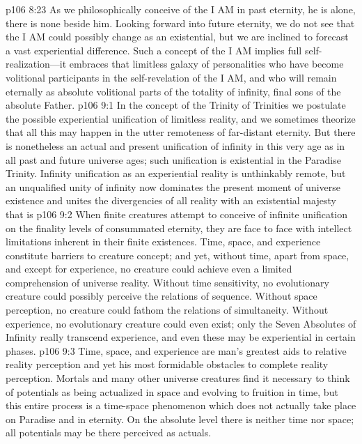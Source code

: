 \vs p106 8:23 As we philosophically conceive of the I AM in past eternity, he is alone, there is none beside him. Looking forward into future eternity, we do not see that the I AM could possibly change as an existential, but we are inclined to forecast a vast experiential difference. Such a concept of the I AM implies full self\hyp{}realization---it embraces that limitless galaxy of personalities who have become volitional participants in the self\hyp{}revelation of the I AM, and who will remain eternally as absolute volitional parts of the totality of infinity, final sons of the absolute Father.
\vs p106 9:1 In the concept of the Trinity of Trinities we postulate the possible experiential unification of limitless reality, and we sometimes theorize that all this may happen in the utter remoteness of far\hyp{}distant eternity. But there is nonetheless an actual and present unification of infinity in this very age as in all past and future universe ages; such unification is existential in the Paradise Trinity. Infinity unification as an experiential reality is unthinkably remote, but an unqualified unity of infinity now dominates the present moment of universe existence and unites the divergencies of all reality with an existential majesty that is 
\vs p106 9:2 When finite creatures attempt to conceive of infinite unification on the finality levels of consummated eternity, they are face to face with intellect limitations inherent in their finite existences. Time, space, and experience constitute barriers to creature concept; and yet, without time, apart from space, and except for experience, no creature could achieve even a limited comprehension of universe reality. Without time sensitivity, no evolutionary creature could possibly perceive the relations of sequence. Without space perception, no creature could fathom the relations of simultaneity. Without experience, no evolutionary creature could even exist; only the Seven Absolutes of Infinity really transcend experience, and even these may be experiential in certain phases.
\vs p106 9:3 Time, space, and experience are man’s greatest aids to relative reality perception and yet his most formidable obstacles to complete reality perception. Mortals and many other universe creatures find it necessary to think of potentials as being actualized in space and evolving to fruition in time, but this entire process is a time\hyp{}space phenomenon which does not actually take place on Paradise and in eternity. On the absolute level there is neither time nor space; all potentials may be there perceived as actuals.
